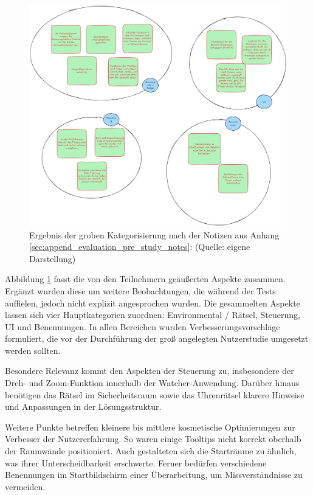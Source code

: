 \begin{figure}[ht]
\centering
\includegraphics[width=1\linewidth]{content/pictures/Prestudy-Qualitative-Auswertung-Schritt-1.png}
\caption{Ergebnis der groben Kategorisierung nach \citealp{braun_using_2006} der Notizen aus Anhang \ref{sec:append_evaluation_pre_study_notes}:  (Quelle: eigene Darstellung)}
\label{fig:pre-study-qualitative-findings}
\end{figure}

Abbildung \ref{fig:pre-study-qualitative-findings} fasst die von den Teilnehmern geäußerten Aspekte zusammen. Ergänzt wurden diese um weitere Beobachtungen, die während der Tests auffielen, jedoch nicht explizit angesprochen wurden. Die gesammelten Aspekte lassen sich vier Hauptkategorien zuordnen: Environmental / Rätsel, Steuerung, UI und Benennungen. In allen Bereichen wurden Verbesserungsvorschläge formuliert, die vor der Durchführung der groß angelegten Nutzerstudie umgesetzt werden sollten.

Besondere Relevanz kommt den Aspekten der Steuerung zu, insbesondere der Dreh- und Zoom-Funktion innerhalb der Watcher-Anwendung. Darüber hinaus benötigen das Rätsel im Sicherheitsraum sowie das Uhrenrätsel klarere Hinweise und Anpassungen in der Lösungsstruktur.

Weitere Punkte betreffen kleinere bis mittlere kosmetische Optimierungen zur Verbesser der Nutzererfahrung. So waren einige Tooltips nicht korrekt oberhalb der Raumwände positioniert. Auch gestalteten sich die Starträume zu ähnlich, was ihrer Unterscheidbarkeit erschwerte. Ferner bedürfen verschiedene Benennungen im Startbildschirm einer Überarbeitung, um Missverständnisse zu vermeiden.

